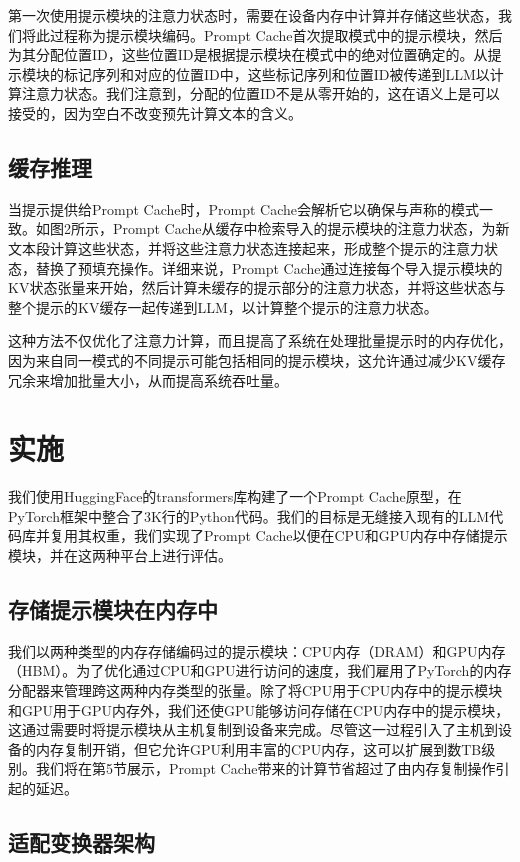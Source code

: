 \documentclass[twocolumn, 10pt]{article} %
\theoremstyle{remark}
\begin{document}
第一次使用提示模块的注意力状态时，需要在设备内存中计算并存储这些状态，我们将此过程称为提示模块编码。Prompt Cache首次提取模式中的提示模块，然后为其分配位置ID，这些位置ID是根据提示模块在模式中的绝对位置确定的。从提示模块的标记序列和对应的位置ID中，这些标记序列和位置ID被传递到LLM以计算注意力状态。我们注意到，分配的位置ID不是从零开始的，这在语义上是可以接受的，因为空白不改变预先计算文本的含义。

\subsection{缓存推理}

当提示提供给Prompt Cache时，Prompt Cache会解析它以确保与声称的模式一致。如图2所示，Prompt Cache从缓存中检索导入的提示模块的注意力状态，为新文本段计算这些状态，并将这些注意力状态连接起来，形成整个提示的注意力状态，替换了预填充操作。详细来说，Prompt Cache通过连接每个导入提示模块的KV状态张量来开始，然后计算未缓存的提示部分的注意力状态，并将这些状态与整个提示的KV缓存一起传递到LLM，以计算整个提示的注意力状态。

这种方法不仅优化了注意力计算，而且提高了系统在处理批量提示时的内存优化，因为来自同一模式的不同提示可能包括相同的提示模块，这允许通过减少KV缓存冗余来增加批量大小，从而提高系统吞吐量。


\section{实施}

我们使用HuggingFace的transformers库构建了一个Prompt Cache原型，在PyTorch框架中整合了3K行的Python代码。我们的目标是无缝接入现有的LLM代码库并复用其权重，我们实现了Prompt Cache以便在CPU和GPU内存中存储提示模块，并在这两种平台上进行评估。

\subsection{存储提示模块在内存中}

我们以两种类型的内存存储编码过的提示模块：CPU内存（DRAM）和GPU内存（HBM）。为了优化通过CPU和GPU进行访问的速度，我们雇用了PyTorch的内存分配器来管理跨这两种内存类型的张量。除了将CPU用于CPU内存中的提示模块和GPU用于GPU内存外，我们还使GPU能够访问存储在CPU内存中的提示模块，这通过需要时将提示模块从主机复制到设备来完成。尽管这一过程引入了主机到设备的内存复制开销，但它允许GPU利用丰富的CPU内存，这可以扩展到数TB级别。我们将在第5节展示，Prompt Cache带来的计算节省超过了由内存复制操作引起的延迟。

\subsection{适配变换器架构}
\end{document}

